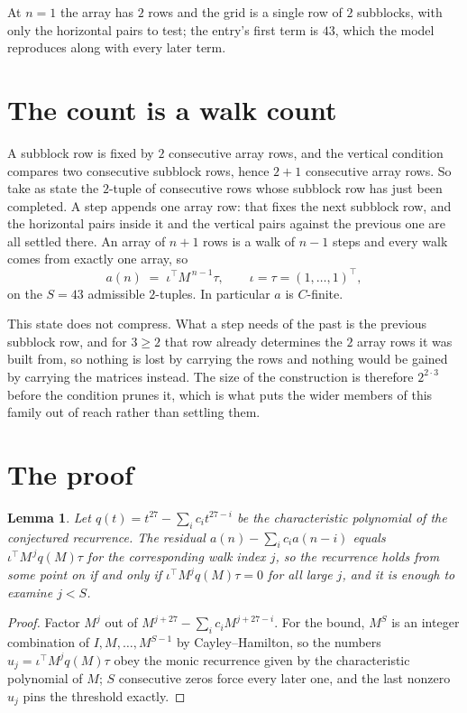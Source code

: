 \documentclass[11pt,a4paper]{article}
\theoremstyle{plain}
\newtheorem{lemma}[theorem]{Lemma}
\theoremstyle{definition}
\begin{document}
At $n=1$ the array has $2$ rows and the grid is a single row of $2$
subblocks, with only the horizontal pairs to test; the entry's first term is
$43$, which the model reproduces along with every later term.

\section{The count is a walk count}

A subblock row is fixed by $2$ consecutive array rows, and the vertical condition compares
two consecutive subblock rows, hence $2+1$ consecutive array rows. So take as state the
$2$-tuple of consecutive rows whose subblock row has just been completed. A step appends one
array row: that fixes the next subblock row, and the horizontal pairs inside it and the
vertical pairs against the previous one are all settled there. An array of $n+1$ rows is
a walk of $n-1$ steps and every walk comes from exactly one array, so
\[
a(n)\;=\;\iota^{\!\top}M^{\,n-1}\tau,\qquad\iota=\tau=(1,\dots,1)^{\!\top},
\]
on the $S=43$ admissible $2$-tuples. In particular $a$ is $C$-finite.

This state does not compress. What a step needs of the past is the previous subblock row, and
for $3\ge2$ that row already determines the $2$ array rows it was built from, so nothing
is lost by carrying the rows and nothing would be gained by carrying the matrices instead. The
size of the construction is therefore $2^{2\cdot3}$ before the condition prunes
it, which is what puts the wider members of this family out of reach rather than settling them.

\section{The proof}

\begin{lemma}\label{lem:crit}
Let $q(t)=t^{27}-\sum_i c_it^{27-i}$ be the characteristic polynomial of the
conjectured recurrence. The residual $a(n)-\sum_ic_ia(n-i)$ equals
$\iota^{\!\top}M^{\,j}q(M)\tau$ for the corresponding walk index $j$, so the recurrence
holds from some point on if and only if $\iota^{\!\top}M^{j}q(M)\tau=0$ for all large $j$,
and it is enough to examine $j<S$.
\end{lemma}

\begin{proof}
Factor $M^{j}$ out of $M^{j+27}-\sum_ic_iM^{j+27-i}$. For the bound, $M^{S}$
is an integer combination of $I,M,\dots,M^{S-1}$ by Cayley--Hamilton, so the numbers
$u_j=\iota^{\!\top}M^{j}q(M)\tau$ obey the monic recurrence given by the characteristic
polynomial of $M$; $S$ consecutive zeros force every later one, and the last nonzero $u_j$
pins the threshold exactly.
\end{proof}
\end{document}
